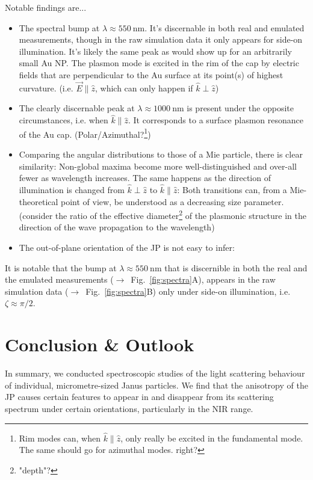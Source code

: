 \documentclass[10pt]{article}
\newcommand{\seefig}[2]{\mbox{\sffamily($\rightarrow$ Fig. \ref{#1}#2)}}
\begin{document}
\begin{multicols}{2}
Notable findings are...
\begin{itemize}
    \item The spectral bump at $\lambda\approx\SI{550}{\nano\meter}$. It's discernable in both real and emulated measurements, though in the raw simulation data it only appears for side-on illumination. 
    It's likely the same peak as would show up for an arbitrarily small Au NP. 
    The plasmon mode is excited in the rim of the cap by electric fields that are perpendicular to the Au surface at its point(s) of highest curvature. (i.e. $\vec{E} \parallel \hat{z}$, which can only happen if $\hat{k} \perp \hat{z}$)
    \item The clearly discernable peak at $\lambda\approx\SI{1000}{\nano\meter}$ is present under the opposite circumstances, i.e. when $\hat{k}\parallel\hat{z}$. 
    It corresponds to a surface plasmon resonance of the Au cap. (Polar/Azimuthal?\footnote{Rim modes can, when $\hat{k}\parallel\hat{z}$, only really be excited in the fundamental mode. The same should go for azimuthal modes. right?})
    \item Comparing the angular distributions to those of a Mie particle, there is clear similarity: 
    Non-global maxima become more well-distinguished and over-all fewer as wavelength increases. 
    The same happens as the direction of illumination is changed from $\hat{k}\perp\hat{z}$ to $\hat{k}\parallel\hat{z}$: Both transitions can, from a Mie-theoretical point of view, be understood as a decreasing size parameter. (consider the ratio of the effective diameter\footnote{"depth"?} of the plasmonic structure in the direction of the wave propagation to the wavelength)  
    \item The out-of-plane orientation of the JP is not easy to infer: 
\end{itemize}

It is notable that the bump at \mbox{$\lambda \approx \SI{550}{\nano\meter}$} that is discernible in both the real and the emulated measurements \seefig{fig:spectra}{A}, appears in the raw simulation data \seefig{fig:spectra}{B} only under side-on illumination, i.e. \mbox{$\zeta\approx\pi/2$}. 

\section*{Conclusion \& Outlook}

In summary, we conducted spectroscopic studies of the light scattering behaviour of individual, micrometre-sized Janus particles. 
We find that the anisotropy of the JP causes certain features to appear in and disappear from its scattering spectrum under certain orientations, particularly in the NIR range. 


\end{multicols}
\end{document}
